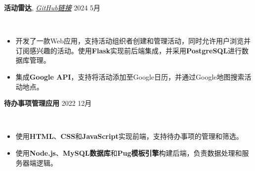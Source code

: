\documentclass{cv}
\newcommand*{\labelfont}{\fontfamily{bch}\selectfont}
\begin{document}
{\labelfont \textbf{活动雷达}, \textit{\href{https://github.com/csci5117s24/project-1-html-heroes}{GitHub链接}} \hspace*{13.3cm}\hspace{1mm}\hspace{1.5mm}2024 5月}
{
\small
\vspace{-15pt}\\
\begin{itemize}
\setlength\itemsep{1pt}
    \item 开发了一款Web应用，支持活动组织者创建和管理活动，同时允许用户浏览并订阅感兴趣的活动。使用\textbf{Flask}实现前后端集成，并采用\textbf{PostgreSQL}进行数据库管理。
    \item 集成\textbf{Google API}，支持将活动添加至Google日历，并通过Google地图搜索活动地点。
\end{itemize}
}

{\labelfont \textbf{待办事项管理应用} \hspace*{13.82cm} \hspace{1.5mm}\hspace{1.5mm}2022 12月}
{
\small
\vspace{-27pt}\\
\begin{itemize}
\setlength\itemsep{1pt}
    \item 使用\textbf{HTML}、\textbf{CSS}和\textbf{JavaScript}实现前端，支持待办事项的管理和筛选。
    \item 使用\textbf{Node.js}、\textbf{MySQL数据库}和\textbf{Pug模板引擎}构建后端，负责数据处理和服务器端逻辑。
\end{itemize}
}

\end{document}
